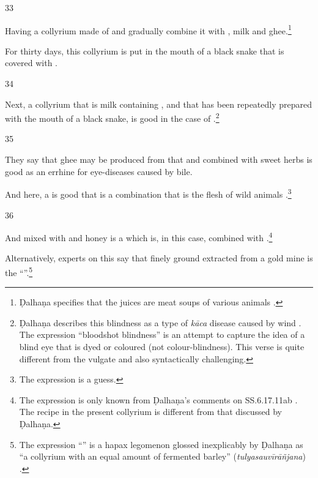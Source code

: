 \begin{translation}
    \item [33]
    
    Having 
    a collyrium made of 
    and gradually combine it with
    , milk and ghee.\footnote{Ḍalhaṇa specifies that the juices are 
    meat soups of various animals \citep[628]{vulgate}.}
    
    For thirty days, this collyrium is put in the mouth of a black snake that is
    covered with .
    
    \item [34]
    
    Next, a collyrium that is milk containing ,
     and  that has been repeatedly 
    prepared
    with the mouth of a black snake, is good in the case of .\footnote{Ḍalhaṇa describes this blindness as a type
    of \emph{kāca} disease caused by wind  \citep[628]{susr-trikamji3}. The expression
    “bloodshot blindness” is an attempt to capture the idea of a blind eye that is
    dyed or coloured (not colour-blindness). This verse is quite different from the
    vulgate and also syntactically challenging.}
    
    \item [35]
    
    They say that ghee may be produced from that and combined with sweet herbs is 
    good as an errhine for eye-diseases caused by bile.
    
    And here,  a  is good that is a combination that is the flesh of
    wild animals .\footnote{The expression
     is a guess.  }
    
    
    \item[36]
    
    And 
     mixed with 
     and honey is a 
     which is, in this case, combined with 
    .\footnote{The expression  is
    only known from Ḍalhaṇa's comments on SS.6.17.11ab \citep[626]{vulgate}.  The
    recipe in the present collyrium is different from that discussed by Ḍalhaṇa.}
    
    Alternatively, experts on this say that finely ground 
    extracted from a gold mine is the “”.\footnote{The
    expression “” is a hapax legomenon glossed
    inexplicably by Ḍalhaṇa as “a collyrium with an equal amount of fermented barley”
    (\emph{tulyasauvīrāñjana}) \citep[628]{vulgate}.}
    

\end{translation}
